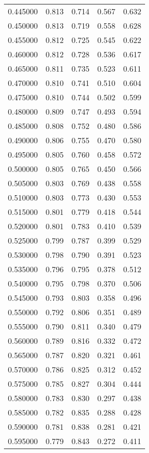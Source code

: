 \begin{table}[htbp]
\begin{tabular}{lllll}
0.445000 & 0.813 & 0.714 & 0.567 & 0.632 \\
0.450000 & 0.813 & 0.719 & 0.558 & 0.628 \\
0.455000 & 0.812 & 0.725 & 0.545 & 0.622 \\
0.460000 & 0.812 & 0.728 & 0.536 & 0.617 \\
0.465000 & 0.811 & 0.735 & 0.523 & 0.611 \\
0.470000 & 0.810 & 0.741 & 0.510 & 0.604 \\
0.475000 & 0.810 & 0.744 & 0.502 & 0.599 \\
0.480000 & 0.809 & 0.747 & 0.493 & 0.594 \\
0.485000 & 0.808 & 0.752 & 0.480 & 0.586 \\
0.490000 & 0.806 & 0.755 & 0.470 & 0.580 \\
0.495000 & 0.805 & 0.760 & 0.458 & 0.572 \\
0.500000 & 0.805 & 0.765 & 0.450 & 0.566 \\
0.505000 & 0.803 & 0.769 & 0.438 & 0.558 \\
0.510000 & 0.803 & 0.773 & 0.430 & 0.553 \\
0.515000 & 0.801 & 0.779 & 0.418 & 0.544 \\
0.520000 & 0.801 & 0.783 & 0.410 & 0.539 \\
0.525000 & 0.799 & 0.787 & 0.399 & 0.529 \\
0.530000 & 0.798 & 0.790 & 0.391 & 0.523 \\
0.535000 & 0.796 & 0.795 & 0.378 & 0.512 \\
0.540000 & 0.795 & 0.798 & 0.370 & 0.506 \\
0.545000 & 0.793 & 0.803 & 0.358 & 0.496 \\
0.550000 & 0.792 & 0.806 & 0.351 & 0.489 \\
0.555000 & 0.790 & 0.811 & 0.340 & 0.479 \\
0.560000 & 0.789 & 0.816 & 0.332 & 0.472 \\
0.565000 & 0.787 & 0.820 & 0.321 & 0.461 \\
0.570000 & 0.786 & 0.825 & 0.312 & 0.452 \\
0.575000 & 0.785 & 0.827 & 0.304 & 0.444 \\
0.580000 & 0.783 & 0.830 & 0.297 & 0.438 \\
0.585000 & 0.782 & 0.835 & 0.288 & 0.428 \\
0.590000 & 0.781 & 0.838 & 0.281 & 0.421 \\
0.595000 & 0.779 & 0.843 & 0.272 & 0.411 \\

\end{tabular}
\end{table}
